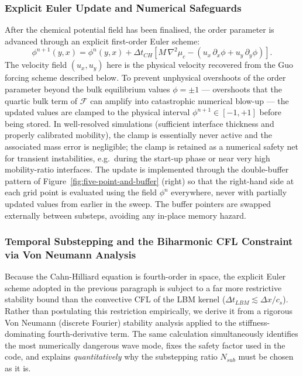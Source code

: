 \subsubsection{Explicit Euler Update and Numerical Safeguards}\label{sec:cahnhilliard-update}
After the chemical potential field has been finalised, the order parameter is advanced through an explicit first-order Euler scheme:
\begin{equation}
    \phi^{n+1}(y, x) = \phi^n(y, x) + \Delta t_{CH}\left[ M\,\nabla^2 \mu_c - \left(u_x\,\partial_x \phi + u_y\,\partial_y \phi\right) \right].
\end{equation}
The velocity field $(u_x, u_y)$ here is the physical velocity recovered from the Guo forcing scheme described below.
To prevent unphysical overshoots of the order parameter beyond the bulk equilibrium values $\phi = \pm 1$ --- overshoots that the quartic bulk term of $\mathcal{F}$ can amplify into catastrophic numerical blow-up --- the updated values are clamped to the physical interval $\phi^{n+1} \in [-1, +1]$ before being stored.
In well-resolved simulations (sufficient interface thickness and properly calibrated mobility), the clamp is essentially never active and the associated mass error is negligible;
the clamp is retained as a numerical safety net for transient instabilities, e.g.\ during the start-up phase or near very high mobility-ratio interfaces.
The update is implemented through the double-buffer pattern of Figure~\ref{fig:five-point-and-buffer} (right) so that the right-hand side at each grid point is evaluated using the field $\phi^n$ everywhere, never with partially updated values from earlier in the sweep.
The buffer pointers are swapped externally between substeps, avoiding any in-place memory hazard.

\subsubsection{Temporal Substepping and the Biharmonic CFL Constraint via Von Neumann Analysis}

Because the Cahn-Hilliard equation is fourth-order in space, the explicit Euler scheme adopted in the previous paragraph is subject to a far more restrictive stability bound than the convective CFL of the LBM kernel ($\Delta t_{LBM} \lesssim \Delta x / c_s$).
Rather than postulating this restriction empirically, we derive it from a rigorous Von Neumann (discrete Fourier) stability analysis applied to the stiffness-dominating fourth-derivative term.
The same calculation simultaneously identifies the most numerically dangerous wave mode, fixes the safety factor used in the code, and explains \emph{quantitatively} why the substepping ratio $N_{sub}$ must be chosen as it is.

